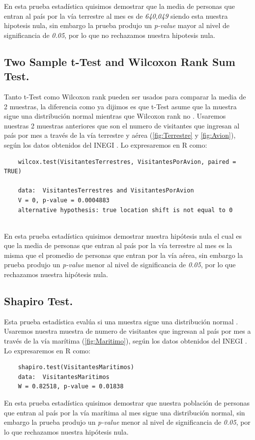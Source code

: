 \documentclass[]{article}
\begin{document}
 En esta prueba estadística quisimos demostrar que la media de personas que entran al país por la vía terrestre al mes es de \textit{640,049} siendo esta nuestra hipotesis nula, sin embargo la prueba produjo un \textit{p-value} mayor al nivel de significancia de \textit{0.05}, por lo que no rechazamos nuestra hipotesis nula.


\subsection{Two Sample t-Test and Wilcoxon Rank Sum Test.}
Tanto t-Test como Wilcoxon rank pueden ser usados para comparar la media de 2 muestras, la diferencia como ya dijimos es que t-Test asume que la muestra sigue una distribución normal mientras que Wilcoxon rank no \cite{Articulo_0}.
Usaremos nuestras 2 muestras anteriores que son el numero de visitantes que ingresan al país por mes a través de la vía terrestre y aérea (\autoref{fig:Terrestre} y \autoref{fig:Avion}), según los datos obtenidos del INEGI \cite{inegi}.
Lo expresaremos en R como:
  \begin{lstlisting}
	wilcox.test(VisitantesTerrestres, VisitantesPorAvion, paired = TRUE)
	
	data:  VisitantesTerrestres and VisitantesPorAvion
	V = 0, p-value = 0.0004883
	alternative hypothesis: true location shift is not equal to 0


   \end{lstlisting}
   
 En esta prueba estadística quisimos demostrar  nuestra hipótesis nula el cual es que la media de personas que entran al país por la vía terrestre al mes es la misma que el promedio de personas que entran por la vía aérea, sin embargo la prueba produjo un \textit{p-value}  menor al nivel de significancia de \textit{0.05}, por lo que rechazamos nuestra hipótesis nula.
 
 
\subsection{Shapiro Test.}
 Esta prueba estadística evalúa si una muestra sigue una distribución normal \cite{Articulo_0}.
 Usaremos nuestra muestra de numero de visitantes que ingresan al país por mes a través de la vía marítima (\autoref{fig:Maritimo}), según los datos obtenidos del INEGI \cite{inegi}.
Lo expresaremos en R como:
  \begin{lstlisting}
	shapiro.test(VisitantesMaritimos)
	data:  VisitantesMaritimos
	W = 0.82518, p-value = 0.01838

   \end{lstlisting}
 En esta prueba estadística quisimos demostrar que  nuestra población de personas que entran al país por la vía marítima al mes sigue una distribución normal, sin embargo la prueba produjo un \textit{p-value}  menor al nivel de significancia de \textit{0.05}, por lo que rechazamos nuestra hipótesis nula.
 
\end{document}
